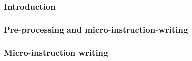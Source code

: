 \subsubsection{Introduction}                                                    \label{mmu: instructions: right padded word extraction: intro}                            
\subsubsection{Pre-processing and micro-instruction-writing}                    \label{mmu: instructions: right padded word extraction: preprocessing}                    
\subsubsection{Micro-instruction writing}                                       \label{mmu: instructions: right padded word extraction: micro instruction writing}           
